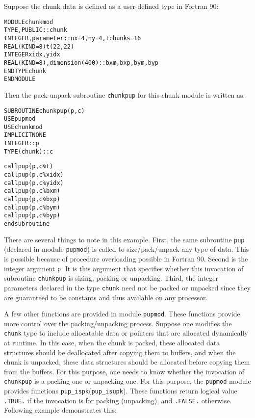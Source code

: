 \documentclass[10pt]{article}
\begin{document}
Suppose the chunk data is defined as a user-defined type in Fortran 90:

\begin{alltt}
MODULE chunkmod
  TYPE, PUBLIC :: chunk
      INTEGER , parameter :: nx=4, ny=4, tchunks=16
      REAL(KIND=8) t(22,22)
      INTEGER xidx, yidx
      REAL(KIND=8), dimension(400):: bxm, bxp, bym, byp
  END TYPE chunk
END MODULE
\end{alltt}

Then the pack-unpack subroutine \texttt{chunkpup} for this chunk module is
written as:

\begin{alltt}
SUBROUTINE chunkpup(p, c)
  USE pupmod
  USE chunkmod
  IMPLICIT NONE
  INTEGER :: p
  TYPE(chunk) :: c

  call pup(p, c\%t)
  call pup(p, c\%xidx)
  call pup(p, c\%yidx)
  call pup(p, c\%bxm)
  call pup(p, c\%bxp)
  call pup(p, c\%bym)
  call pup(p, c\%byp)
end subroutine
\end{alltt}

There are several things to note in this example. First, the same subroutine
\texttt{pup} (declared in module \texttt{pupmod}) is called to size/pack/unpack
any type of data. This is possible because of procedure overloading possible in
Fortran 90. Second is the integer argument \texttt{p}. It is this argument that
specifies whether this invocation of subroutine \texttt{chunkpup} is sizing,
packing or unpacking. Third, the integer parameters declared in the type
\texttt{chunk} need not be packed or unpacked since they are guaranteed to be
constants and thus available on any processor.

A few other functions are provided in module \texttt{pupmod}. These functions
provide more control over the packing/unpacking process. Suppose one modifies
the \texttt{chunk} type to include allocatable data or pointers that are
allocated dynamically at runtime. In this case, when the chunk is packed, these
allocated data structures should be deallocated after copying them to buffers,
and when the chunk is unpacked, these data structures should be allocated
before copying them from the buffers.  For this purpose, one needs to know
whether the invocation of \texttt{chunkpup} is a packing one or unpacking one.
For this purpose, the \texttt{pupmod} module provides functions
\verb+pup_ispk+(\verb+pup_isupk+). These functions return logical value
\verb+.TRUE.+ if the invocation is for packing (unpacking), and \verb+.FALSE.+
otherwise. Following example demonstrates this:
\end{document}
